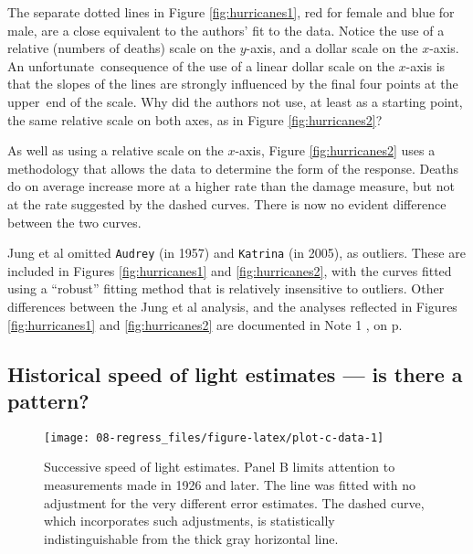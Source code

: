 \documentclass[
  10ptls,
  b5paper]{book}
\begin{document}
The separate dotted lines in Figure \ref{fig:hurricanes1}, red for female and blue for male, are a close equivalent to the authors' fit to the data. Notice the use of a relative (numbers of deaths) scale on the \(y\)-axis, and a dollar scale on the \(x\)-axis. An unfortunate~consequence of the use of a linear dollar scale on the \(x\)-axis is that the slopes of the lines are strongly influenced by the final four points at the upper~end of the scale. Why did the authors not use, at least as a starting point, the same relative scale on both axes, as in Figure \ref{fig:hurricanes2}?

As well as using a relative scale on the \(x\)-axis, Figure \ref{fig:hurricanes2} uses a methodology that allows the data to determine the form of the response. Deaths do on average increase more at a higher rate than the damage measure, but not at the rate suggested by the dashed curves. There is now no evident difference between the two curves.

Jung et al omitted \texttt{Audrey} (in 1957) and \texttt{Katrina} (in 2005), as outliers. These are included in Figures \ref{fig:hurricanes1} and \ref{fig:hurricanes2}, with the curves fitted using a ``robust'' fitting method that is relatively insensitive to outliers. Other differences between the Jung et al analysis, and the analyses reflected in Figures \ref{fig:hurricanes1} and \ref{fig:hurricanes2} are documented in Note 1 , on p.~\pageref{hurricanes}

\subsection*{Historical speed of light estimates --- is there a pattern?}\label{historical-speed-of-light-estimates-is-there-a-pattern}

\begin{figure}[H]

{\centering \texttt{[image: 08-regress\_files/figure-latex/plot-c-data-1]} 

}

\caption{Successive speed of light estimates.  Panel B 
limits attention to measurements made in 1926 and later. 
The line was fitted with no adjustment for the very
different error estimates.  The dashed curve, which 
incorporates such adjustments, is statistically 
indistinguishable from the thick gray horizontal line.}\label{fig:plot-c-data}
\end{figure}
\end{document}
